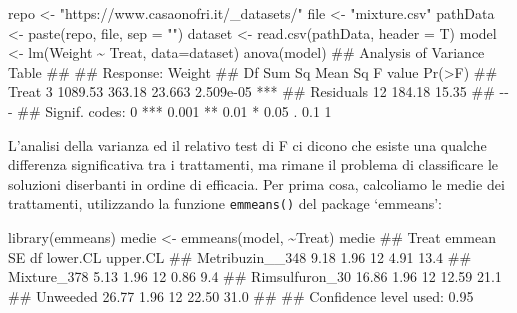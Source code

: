 \documentclass[a4paper,12pt,oneside]{book}
\newenvironment{Shaded}{\begin{snugshade}}{\end{snugshade}}
\newcommand{\SpecialCharTok}[1]{#1}
\newcommand{\StringTok}[1]{#1}
\newcommand{\DocumentationTok}[1]{#1}
\newcommand{\OtherTok}[1]{#1}
\newcommand{\FunctionTok}[1]{#1}
\newcommand{\AttributeTok}[1]{#1}
\newcommand{\NormalTok}[1]{#1}
\begin{document}
\begin{Shaded}
\begin{Highlighting}[]
\NormalTok{repo }\OtherTok{\textless{}{-}} \StringTok{"https://www.casaonofri.it/\_datasets/"}
\NormalTok{file }\OtherTok{\textless{}{-}} \StringTok{"mixture.csv"}
\NormalTok{pathData }\OtherTok{\textless{}{-}} \FunctionTok{paste}\NormalTok{(repo, file, }\AttributeTok{sep =} \StringTok{""}\NormalTok{)}
\NormalTok{dataset }\OtherTok{\textless{}{-}} \FunctionTok{read.csv}\NormalTok{(pathData, }\AttributeTok{header =}\NormalTok{ T)}
\NormalTok{model }\OtherTok{\textless{}{-}} \FunctionTok{lm}\NormalTok{(Weight }\SpecialCharTok{\textasciitilde{}}\NormalTok{ Treat, }\AttributeTok{data=}\NormalTok{dataset)}
\FunctionTok{anova}\NormalTok{(model)}
\DocumentationTok{\#\# Analysis of Variance Table}
\DocumentationTok{\#\# }
\DocumentationTok{\#\# Response: Weight}
\DocumentationTok{\#\#           Df  Sum Sq Mean Sq F value    Pr(\textgreater{}F)    }
\DocumentationTok{\#\# Treat      3 1089.53  363.18  23.663 2.509e{-}05 ***}
\DocumentationTok{\#\# Residuals 12  184.18   15.35                      }
\DocumentationTok{\#\# {-}{-}{-}}
\DocumentationTok{\#\# Signif. codes:  0 \textquotesingle{}***\textquotesingle{} 0.001 \textquotesingle{}**\textquotesingle{} 0.01 \textquotesingle{}*\textquotesingle{} 0.05 \textquotesingle{}.\textquotesingle{} 0.1 \textquotesingle{} \textquotesingle{} 1}
\end{Highlighting}
\end{Shaded}

L'analisi della varianza ed il relativo test di F ci dicono che esiste una qualche differenza significativa tra i trattamenti, ma rimane il problema di classificare le soluzioni diserbanti in ordine di efficacia. Per prima cosa, calcoliamo le medie dei trattamenti, utilizzando la funzione \texttt{emmeans()} del package `emmeans':

\begin{Shaded}
\begin{Highlighting}[]
\FunctionTok{library}\NormalTok{(emmeans)}
\NormalTok{medie }\OtherTok{\textless{}{-}} \FunctionTok{emmeans}\NormalTok{(model, }\SpecialCharTok{\textasciitilde{}}\NormalTok{Treat)}
\NormalTok{medie}
\DocumentationTok{\#\#  Treat           emmean   SE df lower.CL upper.CL}
\DocumentationTok{\#\#  Metribuzin\_\_348   9.18 1.96 12     4.91     13.4}
\DocumentationTok{\#\#  Mixture\_378       5.13 1.96 12     0.86      9.4}
\DocumentationTok{\#\#  Rimsulfuron\_30   16.86 1.96 12    12.59     21.1}
\DocumentationTok{\#\#  Unweeded         26.77 1.96 12    22.50     31.0}
\DocumentationTok{\#\# }
\DocumentationTok{\#\# Confidence level used: 0.95}
\end{Highlighting}
\end{Shaded}
\end{document}
